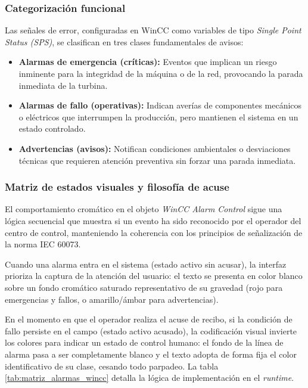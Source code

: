 \subsubsection{Categorización funcional}

Las señales de error, configuradas en WinCC como variables de tipo \textit{Single Point Status (\ac{SPS})}, se clasifican en tres clases fundamentales de avisos:

\begin{itemize}
    \item \textbf{Alarmas de emergencia (críticas):} Eventos que implican un riesgo inminente para la integridad de la máquina o de la red, provocando la parada inmediata de la turbina. 
    \item \textbf{Alarmas de fallo (operativas):} Indican averías de componentes mecánicos o eléctricos que interrumpen la producción, pero mantienen el sistema en un estado controlado. 
    \item \textbf{Advertencias (avisos):} Notifican condiciones ambientales o desviaciones técnicas que requieren atención preventiva sin forzar una parada inmediata.
\end{itemize}

\subsubsection{Matriz de estados visuales y filosofía de acuse}

El comportamiento cromático en el objeto \textit{WinCC Alarm Control} sigue una lógica secuencial que muestra si un evento ha sido reconocido por el operador del centro de control, manteniendo la coherencia con los principios de señalización de la norma IEC 60073. 
\par
Cuando una alarma entra en el sistema (estado activo sin acusar), la interfaz prioriza la captura de la atención del usuario: el texto se presenta en color blanco sobre un fondo cromático saturado representativo de su gravedad (rojo para emergencias y fallos, o amarillo/ámbar para advertencias).\par

En el momento en que el operador realiza el acuse de recibo, si la condición de fallo persiste en el campo (estado activo acusado), la codificación visual invierte los colores para indicar un estado de control humano: el fondo de la línea de alarma pasa a ser completamente blanco y el texto adopta de forma fija el color identificativo de su clase, cesando todo parpadeo. La tabla \ref{tab:matriz_alarmas_wincc} detalla la lógica de implementación en el \textit{runtime}.

